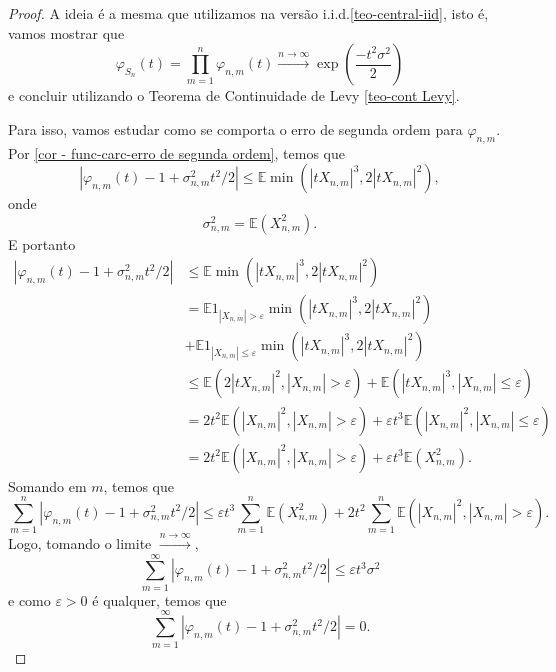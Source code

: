 \documentclass[12pt,a4paper,oneside]{book}
\theoremstyle{definition}
\theoremstyle{remark}
\numberwithin{equation}{section}
\newcommand{\e}{\varepsilon}
\newcommand{\E}{\mathbb{E}}
\newcommand{\rarrowlimn}{\xrightarrow{n\rightarrow \infty}}
\begin{document}
\begin{proof}
A ideia é a mesma que utilizamos na versão i.i.d.\ref{teo-central-iid}, isto é, vamos mostrar que
$$\varphi_{S_n}(t) =\prod_{m=1}^n\varphi_{n,m}(t)\rarrowlimn \exp\left(\dfrac{-t^2\sigma^2}{2} \right) $$
e concluir utilizando o Teorema de Continuidade de Levy \ref{teo-cont Levy}.

Para isso, vamos estudar como se comporta o erro de segunda ordem para $\varphi_{n,m}$. Por \ref{cor - func-carc-erro de segunda ordem}, temos que
$$|\varphi_{n,m}(t) - 1 + \sigma_{n,m}^2t^2/2| \leq \E \min(|tX_{n,m}|^3 , 2|tX_{n,m}|^2), $$
onde 
$$\sigma^2_{n,m} = \E(X_{n,m}^2). $$
E portanto
\begin{align*}
|\varphi_{n,m}(t) - 1 + \sigma_{n,m}^2t^2/2| &\leq \E \min(|tX_{n,m}|^3 , 2|tX_{n,m}|^2)\\
& = \E1_{|X_{n,m}|>\e} \min(|tX_{n,m}|^3 , 2|tX_{n,m}|^2)\\ 
&+ \E1_{|X_{n,m}|\leq \e} \min(|tX_{n,m}|^3 , 2|tX_{n,m}|^2)\\
&\leq  \E( 2|tX_{n,m}|^2,|X_{n,m}|>\e) +  \E( |tX_{n,m}|^3,|X_{n,m}|\leq \e)\\
&=  2t^2\E( |X_{n,m}|^2,|X_{n,m}|>\e) +  \e t^3\E( |X_{n,m}|^2,|X_{n,m}|\leq \e)\\
&=  2t^2\E( |X_{n,m}|^2,|X_{n,m}|>\e) +  \e t^3\E( X_{n,m}^2).
\end{align*}
Somando em $m$, temos que
$$\sum_{m=1}^n  |\varphi_{n,m}(t) - 1 + \sigma_{n,m}^2t^2/2|\leq \e t^3\sum_{m=1}^n\E( X_{n,m}^2)  +  2t^2\sum_{m=1}^n\E( |X_{n,m}|^2,|X_{n,m}|>\e). $$
Logo, tomando o limite $\rarrowlimn$, 
$$\sum_{m=1}^\infty  |\varphi_{n,m}(t) - 1 + \sigma_{n,m}^2t^2/2|\leq \e t^3\sigma^2  $$
e como $\e>0$ é qualquer, temos que
$$\sum_{m=1}^\infty  |\varphi_{n,m}(t) - 1 + \sigma_{n,m}^2t^2/2| = 0. $$


\end{proof}
\end{document}
